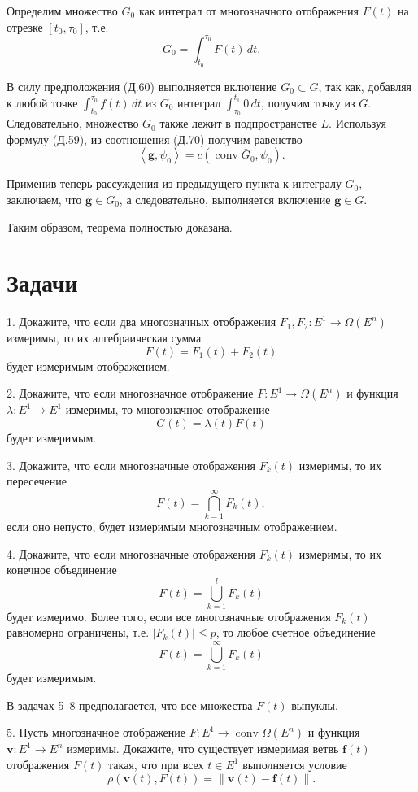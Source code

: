\documentclass[8pt]{extarticle}
\begin{document}
Определим множество \(G_0\) как интеграл от многозначного отображения \(F(t)\) на отрезке \([t_0,\tau_0]\), т.е.
\[
G_0 = \int_{t_0}^{\tau_0} F(t)\,dt.
\]

В силу предположения (Д.60) выполняется включение \(G_0 \subset G\), так как, добавляя к любой точке \(\int_{t_0}^{\tau_0}f(t)\,dt\) из \(G_0\) интеграл \(\int_{\tau_0}^{t_1}0\,dt\), получим точку из \(G\). Следовательно, множество \(G_0\) также лежит в подпространстве \(L\). Используя формулу (Д.59), из соотношения (Д.70) получим равенство
\[
\left\langle \mathbf{g},\psi_0 \right\rangle = c\left( \operatorname{conv}\bar{G}_0,\psi_0 \right).
\]

Применив теперь рассуждения из предыдущего пункта к интегралу \(G_0\), заключаем, что \(\mathbf{g} \in G_0\), а следовательно, выполняется включение \(\mathbf{g} \in G\).

Таким образом, теорема полностью доказана.

\section*{Задачи}

1. Докажите, что если два многозначных отображения \(F_1,F_2 : E^1 \rightarrow \Omega\left( E^n \right)\) измеримы, то их алгебраическая сумма
\[
F(t) = F_1(t) + F_2(t)
\]
будет измеримым отображением.

2. Докажите, что если многозначное отображение \(F : E^1 \rightarrow \Omega\left( E^n \right)\) и функция \(\lambda : E^1 \rightarrow E^1\) измеримы, то многозначное отображение
\[
G(t) = \lambda(t)F(t)
\]
будет измеримым.

3. Докажите, что если многозначные отображения \(F_k(t)\) измеримы, то их пересечение
\[
F(t) = \bigcap_{k=1}^{\infty} F_k(t),
\]
если оно непусто, будет измеримым многозначным отображением.

4. Докажите, что если многозначные отображения \(F_k(t)\) измеримы, то их конечное объединение
\[
F(t) = \bigcup_{k=1}^{l} F_k(t)
\]
будет измеримо. Более того, если все многозначные отображения \(F_k(t)\) равномерно ограничены, т.е. \(\left| F_k(t) \right| \leq p\), то любое счетное объединение
\[
F(t) = \bigcup_{k=1}^{\infty} F_k(t)
\]
будет измеримым.

В задачах 5--8 предполагается, что все множества \(F(t)\) выпуклы.

5. Пусть многозначное отображение \(F : E^1 \rightarrow \operatorname{conv}\Omega\left( E^n \right)\) и функция \(\mathbf{v} : E^1 \rightarrow E^n\) измеримы. Докажите, что существует измеримая ветвь \(\mathbf{f}(t)\) отображения \(F(t)\) такая, что при всех \(t \in E^1\) выполняется условие
\[
\rho\left( \mathbf{v}(t),F(t) \right) = \left\lVert \mathbf{v}(t) - \mathbf{f}(t) \right\rVert .
\]
\end{document}
